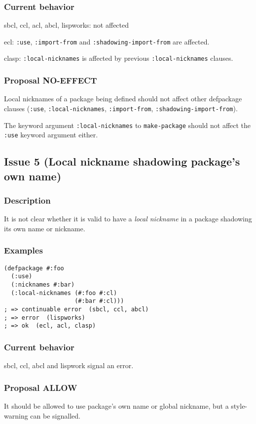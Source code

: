 \documentclass[11pt]{article}
\begin{document}
\subsubsection{Current behavior}
\label{sec:org03f228b}
sbcl, ccl, acl, abcl, lispworks: not affected

ecl: \texttt{:use}, \texttt{:import-from} and \texttt{:shadowing-import-from} are affected.

clasp: \texttt{:local-nicknames} is affected by previous \texttt{:local-nicknames} clauses.
\subsubsection{Proposal NO-EFFECT}
\label{sec:org767def9}
Local nicknames of a package being defined should not affect other defpackage
clauses (\texttt{:use}, \texttt{:local-nicknames}, \texttt{:import-from}, \texttt{:shadowing-import-from}).

The keyword argument \texttt{:local-nicknames} to \texttt{make-package} should not affect the
\texttt{:use} keyword argument either.

\subsection{Issue 5 (Local nickname shadowing package's own name)}
\label{sec:org39f8c46}
\subsubsection{Description}
\label{sec:org335ffd4}
It is not clear whether it is valid to have a \emph{local nickname} in a package
shadowing its own name or nickname.
\subsubsection{Examples}
\label{sec:org19facbd}
\begin{verbatim}
(defpackage #:foo
  (:use)
  (:nicknames #:bar)
  (:local-nicknames (#:foo #:cl)
                    (#:bar #:cl)))
; => continuable error  (sbcl, ccl, abcl)
; => error  (lispworks)
; => ok  (ecl, acl, clasp)
\end{verbatim}
\subsubsection{Current behavior}
\label{sec:org5b3edef}
sbcl, ccl, abcl and lispwork signal an error.
\subsubsection{Proposal ALLOW}
\label{sec:orgf5c5dc7}
It should be allowed to use package's own name or global nickname, but a
style-warning can be signalled.
\end{document}
